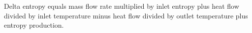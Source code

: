 Delta entropy equals mass flow rate multiplied by inlet entropy plus heat flow divided by inlet temperature minus heat flow divided by outlet temperature plus entropy production.